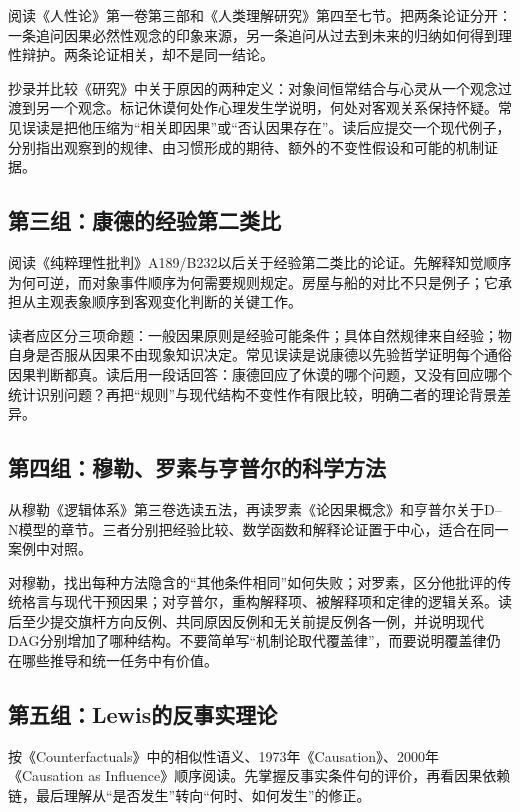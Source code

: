 阅读《人性论》第一卷第三部和《人类理解研究》第四至七节\parencite{humeTreatise,humeEnquiry}。把两条论证分开：一条追问因果必然性观念的印象来源，另一条追问从过去到未来的归纳如何得到理性辩护。两条论证相关，却不是同一结论。

抄录并比较《研究》中关于原因的两种定义：对象间恒常结合与心灵从一个观念过渡到另一个观念。标记休谟何处作心理发生学说明，何处对客观关系保持怀疑。常见误读是把他压缩为“相关即因果”或“否认因果存在”。读后应提交一个现代例子，分别指出观察到的规律、由习惯形成的期待、额外的不变性假设和可能的机制证据。

\subsection*{第三组：康德的经验第二类比}

阅读《纯粹理性批判》A189/B232以后关于经验第二类比的论证\parencite{kantCPR}。先解释知觉顺序为何可逆，而对象事件顺序为何需要规则规定。房屋与船的对比不只是例子；它承担从主观表象顺序到客观变化判断的关键工作。

读者应区分三项命题：一般因果原则是经验可能条件；具体自然规律来自经验；物自身是否服从因果不由现象知识决定。常见误读是说康德以先验哲学证明每个通俗因果判断都真。读后用一段话回答：康德回应了休谟的哪个问题，又没有回应哪个统计识别问题？再把“规则”与现代结构不变性作有限比较，明确二者的理论背景差异。

\subsection*{第四组：穆勒、罗素与亨普尔的科学方法}

从穆勒《逻辑体系》第三卷选读五法，再读罗素《论因果概念》和亨普尔关于D--N模型的章节\parencite{millSystemLogic,russellCausation,hempel1965}。三者分别把经验比较、数学函数和解释论证置于中心，适合在同一案例中对照。

对穆勒，找出每种方法隐含的“其他条件相同”如何失败；对罗素，区分他批评的传统格言与现代干预因果；对亨普尔，重构解释项、被解释项和定律的逻辑关系。读后至少提交旗杆方向反例、共同原因反例和无关前提反例各一例，并说明现代DAG分别增加了哪种结构。不要简单写“机制论取代覆盖律”，而要说明覆盖律仍在哪些推导和统一任务中有价值。

\subsection*{第五组：Lewis的反事实理论}

按《Counterfactuals》中的相似性语义、1973年《Causation》、2000年《Causation as Influence》顺序阅读\parencite{lewisCounterfactuals,lewisCausation1973,lewisInfluence2000}。先掌握反事实条件句的评价，再看因果依赖链，最后理解从“是否发生”转向“何时、如何发生”的修正。

